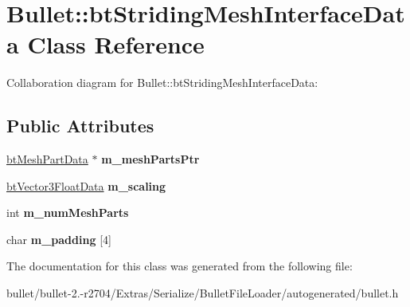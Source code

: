 \hypertarget{class_bullet_1_1bt_striding_mesh_interface_data}{\section{Bullet\+:\+:bt\+Striding\+Mesh\+Interface\+Data Class Reference}
\label{class_bullet_1_1bt_striding_mesh_interface_data}
}


Collaboration diagram for Bullet\+:\+:bt\+Striding\+Mesh\+Interface\+Data\+:
\subsection*{Public Attributes}
\begin{DoxyCompactItemize}
\item 
\hypertarget{class_bullet_1_1bt_striding_mesh_interface_data_a30b264049ad4cdb4426a4d8f3d235ba4}{\hyperlink{class_bullet_1_1bt_mesh_part_data}{bt\+Mesh\+Part\+Data} $\ast$ {\bfseries m\+\_\+mesh\+Parts\+Ptr}}\label{class_bullet_1_1bt_striding_mesh_interface_data_a30b264049ad4cdb4426a4d8f3d235ba4}

\item 
\hypertarget{class_bullet_1_1bt_striding_mesh_interface_data_adebec9f7effc9e4d688dda0a951e9c16}{\hyperlink{class_bullet_1_1bt_vector3_float_data}{bt\+Vector3\+Float\+Data} {\bfseries m\+\_\+scaling}}\label{class_bullet_1_1bt_striding_mesh_interface_data_adebec9f7effc9e4d688dda0a951e9c16}

\item 
\hypertarget{class_bullet_1_1bt_striding_mesh_interface_data_afc9c050394bf050934b3dd339bc2a09a}{int {\bfseries m\+\_\+num\+Mesh\+Parts}}\label{class_bullet_1_1bt_striding_mesh_interface_data_afc9c050394bf050934b3dd339bc2a09a}

\item 
\hypertarget{class_bullet_1_1bt_striding_mesh_interface_data_a685cefd008e49cd6be43bba476e2294a}{char {\bfseries m\+\_\+padding} \mbox{[}4\mbox{]}}\label{class_bullet_1_1bt_striding_mesh_interface_data_a685cefd008e49cd6be43bba476e2294a}

\end{DoxyCompactItemize}


The documentation for this class was generated from the following file\+:\begin{DoxyCompactItemize}
\item 
bullet/bullet-\/2.-\/r2704/\+Extras/\+Serialize/\+Bullet\+File\+Loader/autogenerated/bullet.\+h\end{DoxyCompactItemize}
